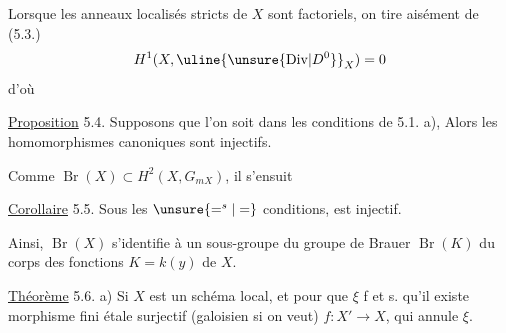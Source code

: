 
Lorsque   les anneaux localisés stricts de $X$ sont factoriels, on tire aisément de (5.3.)
\[
H^1(X,\uline{\unsure{\mathrm{Div}|D^0}}_X)=0
\]
d'où 

\uline{Proposition} 5.4. Supposons que l'on soit dans les conditions de 5.1. a),  Alors les homomorphismes canoniques
sont injectifs.

Comme $\operatorname{Br}(X)\subset H^2(X,G_{mX})$, il s'ensuit

\uline{Corollaire} 5.5. Sous les $\unsure{=^{s}|=}$ conditions,
est injectif.

Ainsi, $\operatorname{Br}(X)$ s'identifie  à un sous-groupe du groupe de Brauer $\operatorname{Br}(K)$ du corps des fonctions $K=k(y)$ de $X$.

\uline{Théorème} 5.6. 
a) Si $X$ est un schéma local, et  pour que $\xi$   f et s. qu'il existe  morphisme fini étale surjectif (galoisien si on veut) $f:X'\longrightarrow X$,  qui  annule $\xi$.


